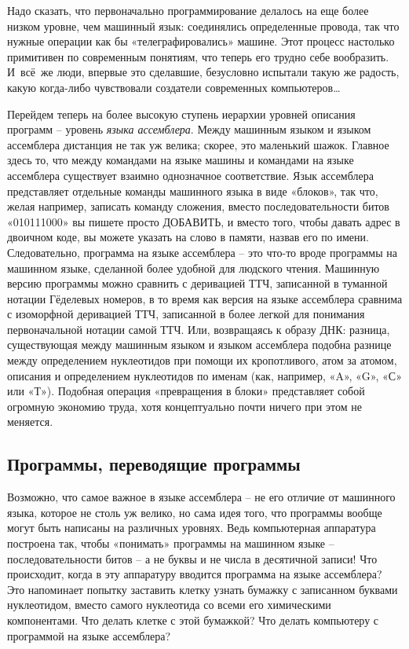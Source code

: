 \documentclass[../main.tex]{subfiles}
\begin{document}
Надо сказать, что первоначально программирование делалось на еще более низком уровне, чем машинный язык: соединялись определенные провода, так что нужные операции как бы «телеграфировались» машине. Этот процесс настолько примитивен по современным понятиям, что теперь его трудно себе вообразить. И~всё~же люди, впервые это сделавшие, безусловно испытали такую же радость, какую когда-либо чувствовали создатели современных компьютеров\ldots{}

Перейдем теперь на более высокую ступень иерархии уровней описания программ \--- уровень \emph{языка ассемблера}. Между машинным языком и языком ассемблера дистанция не так уж велика; скорее, это маленький шажок. Главное здесь то, что между командами на языке машины и командами на языке ассемблера существует взаимно однозначное соответствие. Язык ассемблера представляет отдельные команды машинного языка в виде «блоков», так что, желая например, записать команду сложения, вместо последовательности битов «010111000» вы пишете просто ДОБАВИТЬ, и вместо того, чтобы давать адрес в двоичном коде, вы можете указать на слово в памяти, назвав его по имени. Следовательно, программа на языке ассемблера \--- это что-то вроде программы на машинном языке, сделанной более удобной для людского чтения. Машинную версию программы можно сравнить с деривацией ТТЧ, записанной в туманной нотации Гёделевых номеров, в то время как версия на языке ассемблера сравнима с изоморфной деривацией ТТЧ, записанной в более легкой для понимания первоначальной нотации самой ТТЧ\@. Или, возвращаясь к образу ДНК: разница, существующая между машинным языком и языком ассемблера подобна разнице между определением нуклеотидов при помощи их кропотливого, атом за атомом, описания и определением нуклеотидов по именам (как, например, «A», «G», «С» или «Т»). Подобная операция «превращения в блоки» представляет собой огромную экономию труда, хотя концептуально почти ничего при этом не меняется.


\subsection{Программы, переводящие программы}

Возможно, что самое важное в языке ассемблера \--- не его отличие от машинного языка, которое не столь уж велико, но сама идея того, что программы вообще могут быть написаны на различных уровнях. Ведь компьютерная аппаратура построена так, чтобы «понимать» программы на машинном языке \--- последовательности битов \--- а не буквы и не числа в десятичной записи! Что происходит, когда в эту аппаратуру вводится программа на языке ассемблера? Это напоминает попытку заставить клетку узнать бумажку с записанном буквами нуклеотидом, вместо самого нуклеотида со всеми его химическими компонентами. Что делать клетке с этой бумажкой? Что делать компьютеру с программой на языке ассемблера?
\end{document}
